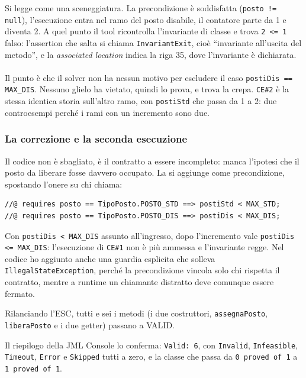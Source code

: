 Si legge come una sceneggiatura. La precondizione è soddisfatta
(\texttt{posto != null}), l'esecuzione entra nel ramo del posto disabile, il contatore
parte da 1 e diventa 2. A quel punto il tool ricontrolla l'invariante di classe e trova
\texttt{2 <= 1} falso: l'assertion che salta si chiama \texttt{InvariantExit}, cioè
``invariante all'uscita del metodo'', e la \emph{associated location} indica la riga 35,
dove l'invariante è dichiarata.
\\ \\
Il punto è che il solver non ha nessun motivo per escludere il caso
\texttt{postiDis == MAX\_DIS}. Nessuno glielo ha vietato, quindi lo prova, e trova la
crepa. \texttt{CE\#2} è la stessa identica storia sull'altro ramo, con \texttt{postiStd}
che passa da 1 a 2: due controesempi perché i rami con un incremento sono due.

\subsubsection{La correzione e la seconda esecuzione}

Il codice non è sbagliato, è il contratto a essere incompleto: manca l'ipotesi che il
posto da liberare fosse davvero occupato. La si aggiunge come precondizione, spostando
l'onere su chi chiama:

\begin{lstlisting}[style=terminal, caption={Versione corretta: il requires di capacità chiude la prova}]
//@ requires posto == TipoPosto.POSTO_STD ==> postiStd < MAX_STD;
//@ requires posto == TipoPosto.POSTO_DIS ==> postiDis < MAX_DIS;
\end{lstlisting}

Con \texttt{postiDis < MAX\_DIS} assunto all'ingresso, dopo l'incremento vale
\texttt{postiDis <= MAX\_DIS}: l'esecuzione di \texttt{CE\#1} non è più ammessa e
l'invariante regge. Nel codice ho aggiunto anche una guardia esplicita che solleva
\texttt{IllegalStateException}, perché la precondizione vincola solo chi rispetta il
contratto, mentre a runtime un chiamante distratto deve comunque essere fermato.

Rilanciando l'ESC, tutti e sei i metodi (i due costruttori, \texttt{assegnaPosto},
\texttt{liberaPosto} e i due getter) passano a VALID.


Il riepilogo della JML Console lo conferma: \texttt{Valid: 6}, con \texttt{Invalid},
\texttt{Infeasible}, \texttt{Timeout}, \texttt{Error} e \texttt{Skipped} tutti a zero, e
la classe che passa da \texttt{0 proved of 1} a \texttt{1 proved of 1}.

